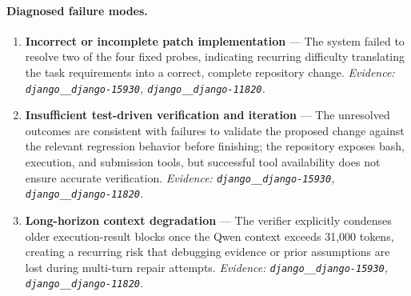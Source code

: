 \paragraph{Diagnosed failure modes.}\begin{enumerate}\itemsep1pt
\item \textbf{Incorrect or incomplete patch implementation} --- The system failed to resolve two of the four fixed probes, indicating recurring difficulty translating the task requirements into a correct, complete repository change. \emph{Evidence: \texttt{django\_\_django-15930}, \texttt{django\_\_django-11820}.}
\item \textbf{Insufficient test-driven verification and iteration} --- The unresolved outcomes are consistent with failures to validate the proposed change against the relevant regression behavior before finishing; the repository exposes bash, execution, and submission tools, but successful tool availability does not ensure accurate verification. \emph{Evidence: \texttt{django\_\_django-15930}, \texttt{django\_\_django-11820}.}
\item \textbf{Long-horizon context degradation} --- The verifier explicitly condenses older execution-result blocks once the Qwen context exceeds 31,000 tokens, creating a recurring risk that debugging evidence or prior assumptions are lost during multi-turn repair attempts. \emph{Evidence: \texttt{django\_\_django-15930}, \texttt{django\_\_django-11820}.}
\end{enumerate}
